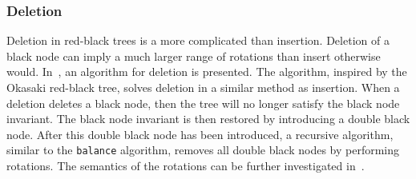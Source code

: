 \subsubsection{Deletion}
Deletion in red-black trees is a more complicated than insertion.
Deletion of a black node can imply a much larger range of rotations than insert otherwise would.
In~\cite{germane2014deletion}, an algorithm for deletion is presented.
The algorithm, inspired by the Okasaki red-black tree, solves deletion in a similar method as insertion.
When a deletion deletes a black node, then the tree will no longer satisfy the black node invariant.
The black node invariant is then restored by introducing a double black node.
After this double black node has been introduced, a recursive algorithm, similar to the \texttt{balance} algorithm, removes all double black nodes by performing rotations.
The semantics of the rotations can be further investigated in~\cite{germane2014deletion}.

